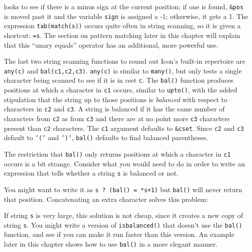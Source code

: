 
\noindent
looks to see if there is a minus sign at the current position; if one is
found, \texttt{\&pos} is moved past it and the variable \texttt{sign}
is assigned a -1; otherwise, it gets a 1. The expression
\texttt{tab(match(s))} occurs quite often in string scanning, so it is
given a shortcut: \texttt{=s}.  The section on pattern matching
later in this chapter will explain that this
``unary equals'' operator has an additional, more powerful use.

The last two string scanning functions to round out
Icon's built-in repertoire are
\texttt{any(c)} and \texttt{bal(c1,c2,c3)}.
\texttt{any(c)} is similar to \texttt{many()}, but only tests a single
character being scanned to see if it is in cset \texttt{c}. The
\texttt{bal()} function produces positions at which a character in
\texttt{c1} occurs, similar to \texttt{upto()}, with the added
stipulation that the string up to those positions is \textit{balanced}
with respect to characters in \texttt{c2} and \texttt{c3}. A string is
balanced if it has the same number of characters from \texttt{c2} as
from \texttt{c3} and there are at no point more \texttt{c3} characters
present than \texttt{c2} characters. The \texttt{c1} argument defaults
to \texttt{\&cset}. Since \texttt{c2} and \texttt{c3} default to
\texttt{'('} and
\texttt{')'}, \texttt{bal()} defaults
to find balanced parentheses.

The restriction that \texttt{bal()} only returns positions at which a
character in \texttt{c1} occurs is a bit strange. Consider what you
would need to do in order to write an expression that tells whether a
string \texttt{s} is balanced or not.

You might want to write it as \texttt{s ? (bal() = *s+1)} but
\texttt{bal()} will never return that position. Concatenating an extra
character solves this problem:


If string \texttt{s} is very large, this solution is not cheap, since it
creates a new copy of string \texttt{s}. You might write a version of
\texttt{isbalanced()} that doesn't use the
\texttt{bal()} function, and see if you can make it run faster than
this version. An example later in this chapter shows how to use
\texttt{bal()} in a more elegant manner.

